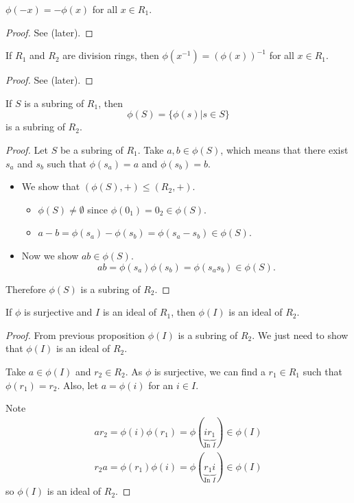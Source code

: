 \begin{proposition}
    $\phi(-x) = -\phi(x)$ for all $x \in R_1$.
\end{proposition}
\begin{proof}
    See  (later).
\end{proof}

\begin{proposition}\label{prop-inverse-under-ring-homomorphism}
    If $R_1$ and $R_2$ are division rings, then $\phi(x^{-1}) = (\phi(x))^{-1}$ for all $x \in R_1$. 
\end{proposition}
\begin{proof}
    See  (later).
\end{proof}

\begin{proposition}\label{prop-homomorphism-on-subring-is-subring}
    If $S$ is a subring of $R_1$, then
    \[
        \phi(S) = \{\phi(s) | s \in S\}
    \]
    is a subring of $R_2$.
\end{proposition}
\begin{proof}
    Let $S$ be a subring of $R_1$. Take $a, b \in \phi(S)$, which means that there exist $s_a$ and $s_b$ such that $\phi(s_a) = a$ and $\phi(s_b) = b$.
    \begin{itemize}
        \item We show that $(\phi(S), +) \leq (R_2, +)$.
        \begin{itemize}
            \item $\phi(S) \neq \emptyset$ since $\phi(0_1) = 0_2 \in \phi(S)$.
            \item $a - b = \phi(s_a) - \phi(s_b) = \phi(s_a-s_b) \in \phi(S)$.
        \end{itemize}

        \item Now we show $ab \in \phi(S)$.
        \[
            ab = \phi(s_a)\phi(s_b) = \phi(s_as_b) \in \phi(S).
        \]
    \end{itemize}
    Therefore $\phi(S)$ is a subring of $R_2$.
\end{proof}

\begin{proposition}
    If $\phi$ is surjective and $I$ is an ideal of $R_1$, then $\phi(I)$ is an ideal of $R_2$.
\end{proposition}
\begin{proof}
    From previous proposition $\phi(I)$ is a subring of $R_2$. We just need to show that $\phi(I)$ is an ideal of $R_2$.

    Take $a \in \phi(I)$ and $r_2 \in R_2$. As $\phi$ is surjective, we can find a $r_1 \in R_1$ such that $\phi(r_1) = r_2$. Also, let $a = \phi(i)$ for an $i \in I$.

    Note
    \begin{align*}
        ar_2 = \phi(i)\phi(r_1) = \phi(\underbrace{ir_1}_{\text{In }I}) \in \phi(I)\\
        r_2a = \phi(r_1)\phi(i) = \phi(\underbrace{r_1i}_{\text{In }I}) \in \phi(I)
    \end{align*}
    so $\phi(I)$ is an ideal of $R_2$.
\end{proof}

